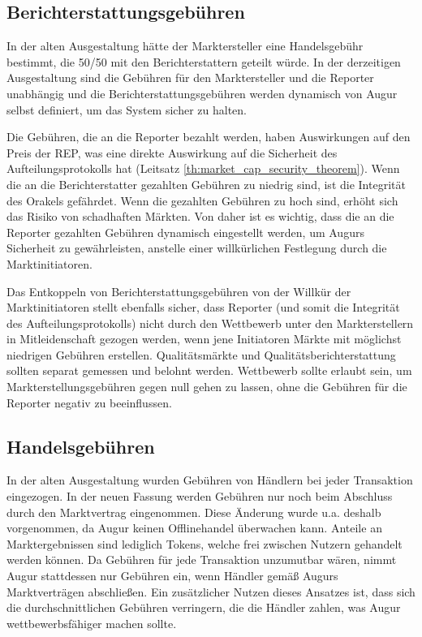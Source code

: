 \documentclass[floatfix,reprint,nofootinbib,amsmath,amssymb,epsfig,pre,floats,letterpaper,groupedaffiliation]{revtex4-1}
\theoremstyle{definition}
\theoremstyle{definition}
\theoremstyle{definition}
\begin{document}
\begin{appendix}
\subsection{Berichterstattungsgebühren}\label{section:rewards_for_reporters_old_v_new}

In der alten Ausgestaltung hätte der Marktersteller eine Handelsgebühr bestimmt, die 50/50 mit den Berichterstattern geteilt würde. In der derzeitigen Ausgestaltung sind die Gebühren für den Marktersteller und die Reporter unabhängig und die Berichterstattungsgebühren werden dynamisch von Augur selbst definiert, um das System sicher zu halten.

Die Gebühren, die an die Reporter bezahlt werden, haben Auswirkungen auf den Preis der REP, was eine direkte Auswirkung auf die Sicherheit des Aufteilungsprotokolls hat (Leitsatz \ref{th:market_cap_security_theorem}). Wenn die an die Berichterstatter gezahlten Gebühren zu niedrig sind, ist die Integrität des Orakels gefährdet. Wenn die gezahlten Gebühren zu hoch sind, erhöht sich das Risiko von schadhaften Märkten. Von daher ist es wichtig, dass die an die Reporter gezahlten Gebühren dynamisch eingestellt werden, um Augurs Sicherheit zu gewährleisten, anstelle einer willkürlichen Festlegung durch die Marktinitiatoren.

Das Entkoppeln von Berichterstattungsgebühren von der Willkür der Marktinitiatoren stellt ebenfalls sicher, dass Reporter (und somit die Integrität des Aufteilungsprotokolls) nicht durch den Wettbewerb unter den Markterstellern in Mitleidenschaft gezogen werden, wenn jene Initiatoren Märkte mit möglichst niedrigen Gebühren erstellen. Qualitätsmärkte und Qualitätsberichterstattung sollten separat gemessen und belohnt werden. Wettbewerb sollte erlaubt sein, um Markterstellungsgebühren gegen null gehen zu lassen, ohne die Gebühren für die Reporter negativ zu beeinflussen.

\subsection{Handelsgebühren}\label{section:fees_paid_by_traders_old_v_new}

In der alten Ausgestaltung wurden Gebühren von Händlern bei jeder Transaktion eingezogen. In der neuen Fassung werden Gebühren nur noch beim Abschluss durch den Marktvertrag eingenommen. Diese Änderung wurde u.a. deshalb vorgenommen, da Augur keinen Offlinehandel überwachen kann. Anteile an Marktergebnissen sind lediglich Tokens, welche frei zwischen Nutzern gehandelt werden können. Da Gebühren für jede Transaktion unzumutbar wären, nimmt Augur stattdessen nur Gebühren ein, wenn Händler gemäß Augurs Marktverträgen abschließen. Ein zusätzlicher Nutzen dieses Ansatzes ist, dass sich die durchschnittlichen Gebühren verringern, die die Händler zahlen, was Augur wettbewerbsfähiger machen sollte.


\end{appendix}
\end{document}

